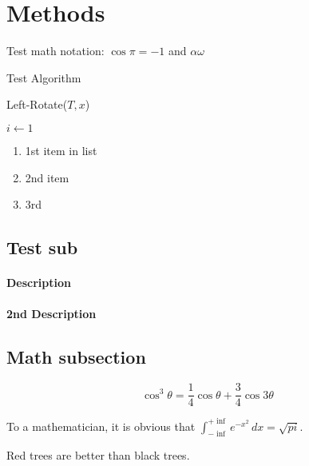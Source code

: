 \documentclass[10pt, 
a4paper, 
oneside, 
headinclude, footinclude, 
BCOR5mm]
{scrartcl}
\begin{document}
\newpage
\section{Methods}

Test math notation: $\cos\pi=-1$ and $\alpha\omega$

Test Algorithm
\IncMargin{1em}
\begin{algorithm}
    \caption{Left-Rotate($T,x$)}
    \BlankLine

    $i \gets 1$\;

\end{algorithm}\DecMargin{1em}


\begin{enumerate}
    \item 1st item in list
    \item 2nd item 
    \item 3rd
\end{enumerate}

\subsection{Test sub}

\paragraph{Description}
\paragraph{2nd Description}

\subsection{Math subsection}

\begin{equation}
    \cos^3 \theta = \frac{1}{4}\cos\theta + \frac{3}{4}\cos 3\theta
    \label{eq:refname2}
\end{equation}

\begin{definition}[Gauss]
    To a mathematician, it is obvious that
    $\int_{-\inf}^{+\inf} e^{-x^2}\, dx=\sqrt{pi}$.
\end{definition}

\begin{theorem}
    Red trees are better than black trees.
\end{theorem}
\end{document}
